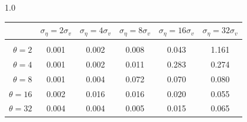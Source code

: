 \documentclass[12pt]{article}
\begin{document}
\begin{table}[h!]
\begin{subtable}{1.0\textwidth}
    \centering
\begin{tabular}{rccccc}
\hline  
            & \multicolumn{1}{l}{$\sigma_{\eta} =2\sigma_{v}$} & \multicolumn{1}{l}{$\sigma_{\eta} =4\sigma_{v}$} & \multicolumn{1}{l}{$\sigma_{\eta} =8\sigma_{v}$} & \multicolumn{1}{l}{$\sigma_{\eta} =16\sigma_{v}$} & \multicolumn{1}{l}{$\sigma_{\eta} =32\sigma_{v}$} \\ \hline  \vspace{-3mm} \\          
$\theta=2$  & 0.001                                             & 0.002                                             & 0.008                                             & 0.043                                              & 1.161                                              \\ \hline
$\theta=4$  & 0.001                                             & 0.002                                             & 0.011                                             & 0.283                                              & 0.274                                              \\ \hline
$\theta=8$  & 0.001                                             & 0.004                                             & 0.072                                             & 0.070                                              & 0.080                                              \\ \hline
$\theta=16$ & 0.002                                             & 0.016                                             & 0.016                                             & 0.020                                              & 0.055                                              \\ \hline
$\theta=32$ & 0.004                                             & 0.004                                             & 0.005                                             & 0.015                                              & 0.065                                              \\ \hline
\end{tabular}
\end{subtable}


\end{table}
\end{document}

